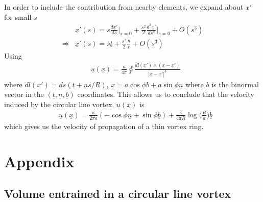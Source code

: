 \documentclass[11pt,a4paper]{article}
\newcommand{\vect}[1]{\underline{#1}}
\newcommand{\1}{\vect{1}}
\newcommand{\RA}{\Rightarrow}
\newcommand{\x}{\vect x}
\newcommand{\xp}{\vect x'}
\begin{document}
In order to include the contribution from nearby elements, we expand about $\xp$ for small $s$
\begin{align*}
&\xp (s) = s\frac{d\xp}{ds}\bigg|_{s=0} + \frac{s^2}{2} \frac{d^2\xp}{ds^2}\bigg|_{s=0} + O(s^3)\\
\RA& \xp (s) = s \vect t + \frac{s^2}{2} \frac{\vect n}{r} + O(s^3)
\end{align*}
Using
\begin{align*}
&\vect u(\x) = \frac{\kappa}{4 \pi} \oint \frac{dl(\xp) \wedge (\x - \xp)}{|\x-\xp|^3}
\end{align*}
where $dl(\xp) = ds(\vect t + \vect n s/R)$, $\x = a\cos\phi \vect b + a\sin\phi \vect n$ where  $\vect b$ is the binormal vector in the $(\vect t, \vect n, \vect b)$ coordinates. This allows us to conclude that the velocity induced by the circular line vortex, $\vect u(\x)$ is
\begin{align*}
&\vect u(\x) = \frac{\kappa}{2\pi a}(-\cos\phi \vect n + \sin\phi \vect b) + \frac{\kappa}{4\pi R} \log\bigg(\frac{R}{a}\bigg) \vect b
\end{align*}
which gives us the velocity of propagation of a thin vortex ring.

\section{Appendix}
\subsection{Volume entrained in a circular line vortex}
\end{document}
